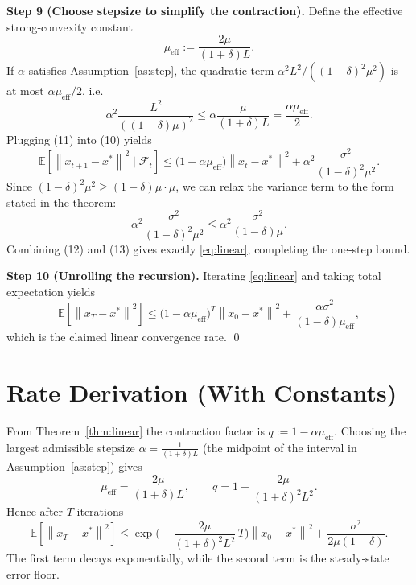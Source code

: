 \documentclass[11pt]{article}
\newcommand{\E}{\mathbb{E}}
\newcommand{\norm}[1]{\left\|#1\right\|}
\begin{document}
\bigskip
\noindent\textbf{Step 9 (Choose stepsize to simplify the contraction).}  
Define the effective strong‑convexity constant
\[
\mu_{\mathrm{eff}}:=\frac{2\mu}{(1+\delta)L}.
\]
If $\alpha$ satisfies Assumption~\ref{as:step}, the quadratic term $\alpha^{2}L^{2}/((1-\delta)^{2}\mu^{2})$ is at most $\alpha\mu_{\mathrm{eff}}/2$, i.e.
\[
\alpha^{2}\frac{L^{2}}{((1-\delta)\mu)^{2}}
\le \alpha\frac{\mu}{(1+\delta)L}
= \frac{\alpha\mu_{\mathrm{eff}}}{2}.
\tag{11}
\]
Plugging (11) into (10) yields
\[
\E\!\left[\norm{x_{t+1}-x^{*}}^{2}\mid\mathcal{F}_{t}\right]
\le\big(1-\alpha\mu_{\mathrm{eff}}\big)\norm{x_{t}-x^{*}}^{2}
+\alpha^{2}\frac{\sigma^{2}}{(1-\delta)^{2}\mu^{2}}.
\tag{12}
\]
Since $(1-\delta)^{2}\mu^{2}\ge (1-\delta)\mu\cdot\mu$, we can relax the variance term to the form stated in the theorem:
\[
\alpha^{2}\frac{\sigma^{2}}{(1-\delta)^{2}\mu^{2}}
\le \alpha^{2}\frac{\sigma^{2}}{(1-\delta)\mu}.
\tag{13}
\]
Combining (12) and (13) gives exactly \eqref{eq:linear}, completing the one‑step bound. \hfill\qedsymbol

\bigskip
\noindent\textbf{Step 10 (Unrolling the recursion).}  
Iterating \eqref{eq:linear} and taking total expectation yields
\[
\E\!\left[\norm{x_{T}-x^{*}}^{2}\right]
\le\big(1-\alpha\mu_{\mathrm{eff}}\big)^{T}\norm{x_{0}-x^{*}}^{2}
+\frac{\alpha\sigma^{2}}{(1-\delta)\mu_{\mathrm{eff}}},
\]
which is the claimed linear convergence rate. \hfill\qed

\section*{Rate Derivation (With Constants)}
From Theorem~\ref{thm:linear} the contraction factor is $q:=1-\alpha\mu_{\mathrm{eff}}$.
Choosing the largest admissible stepsize $\alpha=\frac{1}{(1+\delta)L}$ (the midpoint of the interval in Assumption~\ref{as:step}) gives
\[
\mu_{\mathrm{eff}}=\frac{2\mu}{(1+\delta)L},\qquad
q=1-\frac{2\mu}{(1+\delta)^{2}L^{2}}.
\]
Hence after $T$ iterations
\[
\E\!\left[\norm{x_{T}-x^{*}}^{2}\right]
\le \exp\!\Big(-\frac{2\mu}{(1+\delta)^{2}L^{2}}\,T\Big)\norm{x_{0}-x^{*}}^{2}
+\frac{\sigma^{2}}{2\mu(1-\delta)}.
\]
The first term decays exponentially, while the second term is the steady‑state error floor.

\end{document}

